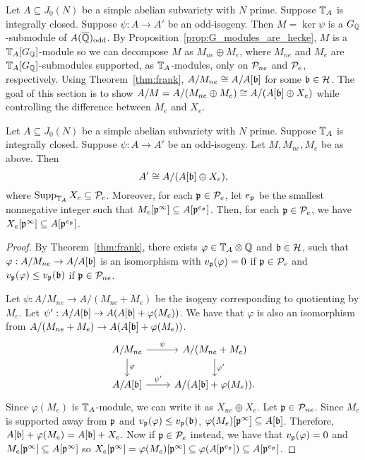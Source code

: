 \documentclass[thesis.tex]{subfiles}
\begin{document}
Let $A\subseteq J_0(N)$ be a simple abelian subvariety with $N$ prime. Suppose
$\TT_A$ is integrally closed. Suppose $\psi:A\to A'$ be an odd-isogeny. Then
$M=\ker\psi$ is a $G_\QQ$-submodule of $A(\QQbar)_\odd$. By
Proposition~\ref{prop:G_modules_are_hecke}, $M$ is a $\TT_A[G_\QQ]$-module so
we can decompose $M$ as $M_{ne}\oplus M_e$, where $M_{ne}$ and $M_e$ are
$\TT_A[G_\QQ]$-submodules supported, as $\TT_A$-modules, only on $\P_{ne}$ and
$\P_e$, respectively. Using Theorem~\ref{thm:frank}, $A/M_{ne} \isom A/A[\b]$
for some $\b\in \H$. The goal of this section is to show $A/M=A/(M_{ne}\oplus
M_e) \isom A/(A[\b]\oplus X_e)$ while controlling the difference between $M_e$
and $X_e$.


\begin{proposition}%
    \label{prop:control_supp}
    Let $A\subseteq J_0(N)$ be a simple abelian subvariety with $N$ prime.
    Suppose $\TT_A$ is integrally closed. Suppose $\psi:A\to A'$ be an
    odd-isogeny. Let $M, M_{ne}, M_e$ be as above. Then
    \[
        A'\isom A/(A[\b]\oplus X_e),
    \]
    where $\Supp_{\TT_A} X_e\subseteq \P_e$. Moreover, for each $\p\in \P_e$,
    let $e_\p$ be the smallest nonnegative integer such that
    $M_e[\p^{\infty}]\subseteq A[\p^{e_\p}]$. Then, for each $\p\in \P_e$, we
    have $X_e[\p^\infty]\subseteq A[\p^{e_\p}]$.
\end{proposition}
\begin{proof}
    By Theorem~\ref{thm:frank}, there exists $\varphi\in \TT_A\otimes \QQ$ and
    $\b\in \H$, such that $\varphi:A/M_{ne}\to A/A[\b]$ is an isomorphism with
    $v_\p(\varphi)=0$ if $\p\in \P_e$ and $v_\p(\varphi)\leq v_\p(\b)$ if
    $\p\in \P_{ne}$.

    Let $\psi:A/M_{ne}\to A/(M_{ne}+M_e)$ be the isogeny corresponding to
    quotienting by $M_e$. Let $\psi':A/A[\b]\to A(A[\b]+\varphi(M_e))$. We have
    that $\varphi$ is also an isomorphism from $A/(M_{ne}+M_e)\to
    A(A[\b]+\varphi(M_e))$. 
    \[
        \begin{tikzcd}
            A/M_{ne}
            \arrow[r, "\psi"]
            \arrow[d, "\varphi"]
            &
            A/(M_{ne}+M_e)
            \arrow[d, "\varphi'"]
            \\
            A/A[\b]
            \arrow[r, "\psi'"]
            &
            A/(A[\b]+\varphi(M_e)).
        \end{tikzcd}
    \] 
    Since $\varphi(M_e)$ is $\TT_A$-module, we can write it as $X_{ne}\oplus
    X_e$. Let $\p\in \P_{ne}$. Since $M_e$ is supported away from $\p$ and
    $v_\p(\varphi)\leq v_\p(\b)$, $\varphi(M_e)[\p^\infty]\subseteq A[\b]$.
    Therefore, $A[\b] + \varphi(M_e)=A[\b] + X_{e}$. Now if $\p\in \P_e$
    instead, we have that $v_\p(\varphi)=0$ and $M_e[\p^\infty]\subseteq
    A[\p^\infty]$ so $X_e[\p^\infty]=\varphi(M_e)[\p^\infty]\subseteq
    \varphi(A[\p^{e_\p}])\subseteq A[\p^{e_\p}]$.
\end{proof}
\end{document}
